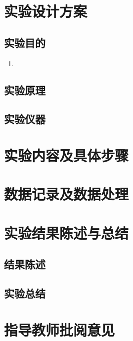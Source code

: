\documentclass[a4paper]{ctexart}
\begin{document}
\phyExpCover
\section{实验设计方案}  

\subsection{实验目的}
\begin{enumerate}
  \item 
\end{enumerate}

\subsection{实验原理}

\subsection{实验仪器}

\longLine
\section{实验内容及具体步骤}

\longLine
\section{数据记录及数据处理}

\longLine
\section{实验结果陈述与总结}

\subsection{结果陈述}

\subsection{实验总结}


\longLine
\section*{指导教师批阅意见}
  \quad
  \longLine
\end{document}
